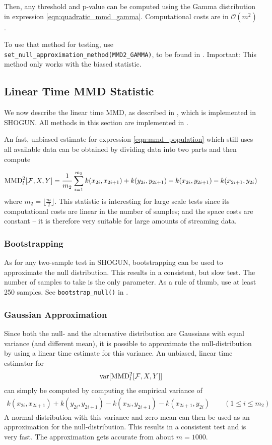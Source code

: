 Then, any threshold and p-value can be computed using the Gamma distribution in expression \ref{eqn:quadratic_mmd_gamma}. Computational costs are in $\mathcal{O}(m^2)$.

To use that method for testing, use \texttt{set\_null\_approximation\_method(MMD2\_GAMMA)}, to be found in . Important: This method only works with the biased statistic.


\subsection{Linear Time MMD Statistic}
\label{sec:mmd_linear}
We now describe the linear time MMD, as described in \citep[Section 6]{Gretton2012}, which is implemented in SHOGUN. All methods in this section are implemented in .

An fast, unbiased estimate for expression \ref{eqn:mmd_population} which still uses all available data can be obtained by dividing data into two parts and then compute

\begin{align*}
\operatorname{MMD}_l^2[\mathcal{F},X,Y]=\frac{1}{m_2}\sum_{i=1}^{m_2} k(x_{2i},x_{2i+1})+k(y_{2i},y_{2i+1})-k(x_{2i},y_{2i+1})-
  k(x_{2i+1},y_{2i})
\end{align*}
where $ m_2=\lfloor\frac{m}{2} \rfloor$. This statistic is interesting for large scale tests since its computational costs are linear in the number of samples; and the space costs are constant -- it is therefore very suitable for large amounts of streaming data.

\subsubsection{Bootstrapping}
As for any two-sample test in SHOGUN, bootstrapping can be used to approximate the null distribution. This results in a consistent, but slow test. The number of samples to take is the only parameter. As a rule of thumb, use at least 250 samples.
See \texttt{bootstrap\_null()} in .

\subsubsection{Gaussian Approximation}
Since both the null- and the alternative distribution are Gaussians with equal variance (and different mean), it is possible to approximate the null-distribution by using a linear time estimate for this variance. An unbiased, linear time estimator for
\begin{align*}
\operatorname{var}[\operatorname{MMD}_l^2[\mathcal{F},X,Y]]
\end{align*}
can simply be computed by computing the empirical variance of
\begin{align*}
k(x_{2i},x_{2i+1})+k(y_{2i},y_{2i+1})-k(x_{2i},y_{2i+1})-k(x_{2i+1},y_{2i}) \qquad (1\leq i\leq m_2)
\end{align*}
A normal distribution with this variance and zero mean can then be used as an approximation for the null-distribution. This results in a consistent test and is very fast. The approximation gets accurate from about $m=1000$.

